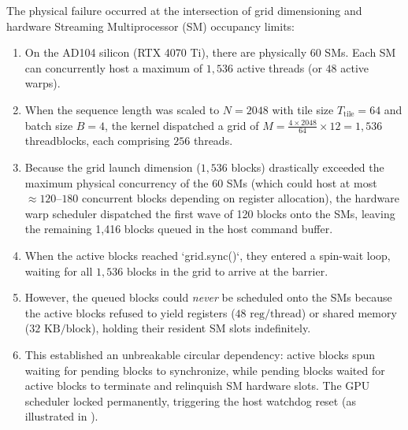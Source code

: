 The physical failure occurred at the intersection of grid dimensioning and hardware Streaming Multiprocessor (SM) occupancy limits:
\begin{enumerate}
    \item On the AD104 silicon (RTX 4070 Ti), there are physically 60 SMs. Each SM can concurrently host a maximum of $1,536$ active threads (or $48$ active warps).
    \item When the sequence length was scaled to $N = 2048$ with tile size $T_{\text{tile}} = 64$ and batch size $B=4$, the kernel dispatched a grid of $M = \frac{4 \times 2048}{64} \times 12 = 1{,}536$ threadblocks, each comprising $256$ threads.
    \item Because the grid launch dimension ($1{,}536$ blocks) drastically exceeded the maximum physical concurrency of the 60 SMs (which could host at most $\approx 120\text{--}180$ concurrent blocks depending on register allocation), the hardware warp scheduler dispatched the first wave of 120 blocks onto the SMs, leaving the remaining 1,416 blocks queued in the host command buffer.
    \item When the active blocks reached `grid.sync()`, they entered a spin-wait loop, waiting for all $1{,}536$ blocks in the grid to arrive at the barrier.
    \item However, the queued blocks could \emph{never} be scheduled onto the SMs because the active blocks refused to yield registers ($48\text{ reg/thread}$) or shared memory ($32\text{ KB/block}$), holding their resident SM slots indefinitely.
    \item This established an unbreakable circular dependency: active blocks spun waiting for pending blocks to synchronize, while pending blocks waited for active blocks to terminate and relinquish SM hardware slots. The GPU scheduler locked permanently, triggering the host watchdog reset (as illustrated in ).
\end{enumerate}

